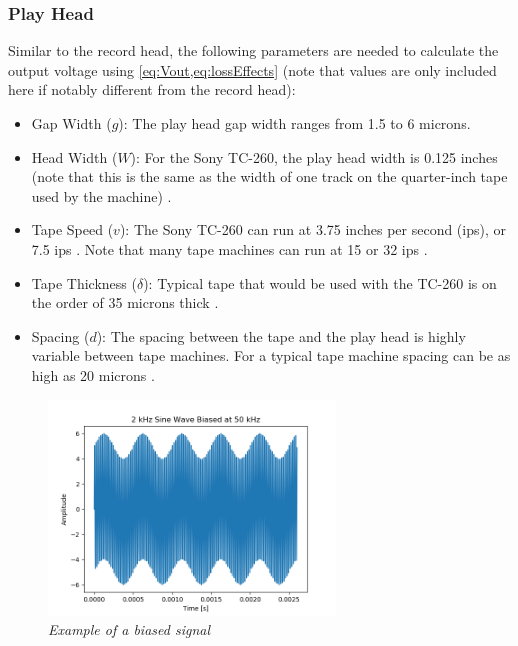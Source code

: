 \documentclass[twoside,a4paper]{article}
\begin{document}
\subsubsection{Play Head}
Similar to the record head, the following parameters
are needed to calculate the output voltage using
\cref{eq:Vout,eq:lossEffects} (note that values are only included
here if notably different from the record head):
\begin{itemize}
\item Gap Width ($g$): The play head gap width ranges from
1.5 to 6 microns\cite{Kadis}.
\item Head Width ($W$): For the Sony TC-260, the play head
width is 0.125 inches (note that this is the same as the
width of one track on the quarter-inch tape used by the 
machine) \cite{RefManual}.
\item Tape Speed ($v$): The Sony TC-260 can run at 3.75 inches
per second (ips), or 7.5 ips \cite{RefManual}. Note that many
 tape machines can run at 15 or 32 ips \cite{Kadis}.
\item Tape Thickness ($\delta$): Typical tape that would be used
with the TC-260 is on the order of 35 microns thick \cite{RefManual}.
\item Spacing ($d$): The spacing between the tape and the play
head is highly variable between tape machines. For a typical
tape machine spacing can be as high as 20 microns \cite{Kadis}.
\end{itemize}

\begin{figure}[ht]
    \center
    \includegraphics[width=3in]{../Simulations/Bias/BiasEx.png}
    \caption{\label{Bias}{\it Example of a biased signal}}
\end{figure}
%
\end{document}
